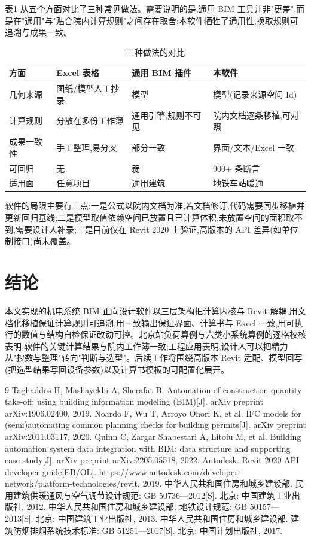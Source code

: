 \documentclass[UTF8,a4paper,zihao=-4]{ctexart}
\begin{document}
表\ref{tab:compare} 从五个方面对比了三种常见做法。需要说明的是,通用 BIM 工具并非"更差",而是在"通用"与"贴合院内计算规则"之间存在取舍;本软件牺牲了通用性,换取规则可追溯与成果一致。

\begin{table}[H]
\centering
\caption{三种做法的对比}\label{tab:compare}
\small
\begin{tabular}{p{2.6cm}p{4.0cm}p{4.0cm}p{4.2cm}}
\toprule
方面 & Excel 表格 & 通用 BIM 插件 & 本软件 \\
\midrule
几何来源 & 图纸/模型人工抄录 & 模型 & 模型(记录来源空间 Id) \\
计算规则 & 分散在多份工作簿 & 通用引擎,规则不可见 & 院内文档逐条移植,可对照 \\
成果一致性 & 手工整理,易分叉 & 部分一致 & 界面/文本/Excel 一致 \\
可回归 & 无 & 弱 & 900+ 条断言 \\
适用面 & 任意项目 & 通用建筑 & 地铁车站暖通 \\
\bottomrule
\end{tabular}
\end{table}

软件的局限主要有三点:一是公式以院内文档为准,若文档修订,代码需要同步移植并更新回归基线;二是模型取值依赖空间已放置且已计算体积,未放置空间的面积取不到,需要设计人补录;三是目前仅在 Revit 2020 上验证,高版本的 API 差异(如单位制接口)尚未覆盖。

\section{结论}

本文实现的机电系统 BIM 正向设计软件以三层架构把计算内核与 Revit 解耦,用文档化移植保证计算规则可追溯,用一致输出保证界面、计算书与 Excel 一致,用可执行的数值与结构自检保证改动可控。北京站负荷算例与六类小系统算例的逐格校核表明,软件的关键计算结果与院内工作簿一致;工程应用表明,设计人可以把精力从"抄数与整理"转向"判断与选型"。后续工作将围绕高版本 Revit 适配、模型回写(把选型结果写回设备参数)以及计算书模板的可配置化展开。


\begin{thebibliography}{9}
 Taghaddos H, Mashayekhi A, Sherafat B. Automation of construction quantity take-off: using building information modeling (BIM)[J]. arXiv preprint arXiv:1906.02400, 2019.
 Noardo F, Wu T, Arroyo Ohori K, et al. IFC models for (semi)automating common planning checks for building permits[J]. arXiv preprint arXiv:2011.03117, 2020.
 Quinn C, Zargar Shabestari A, Litoiu M, et al. Building automation system data integration with BIM: data structure and supporting case study[J]. arXiv preprint arXiv:2205.05518, 2022.
 Autodesk. Revit 2020 API developer guide[EB/OL]. https://www.autodesk.com/developer-network/platform-technologies/revit, 2019.
 中华人民共和国住房和城乡建设部. 民用建筑供暖通风与空气调节设计规范: GB 50736---2012[S]. 北京: 中国建筑工业出版社, 2012.
 中华人民共和国住房和城乡建设部. 地铁设计规范: GB 50157---2013[S]. 北京: 中国建筑工业出版社, 2013.
 中华人民共和国住房和城乡建设部. 建筑防烟排烟系统技术标准: GB 51251---2017[S]. 北京: 中国计划出版社, 2017.
\end{thebibliography}
\end{document}
